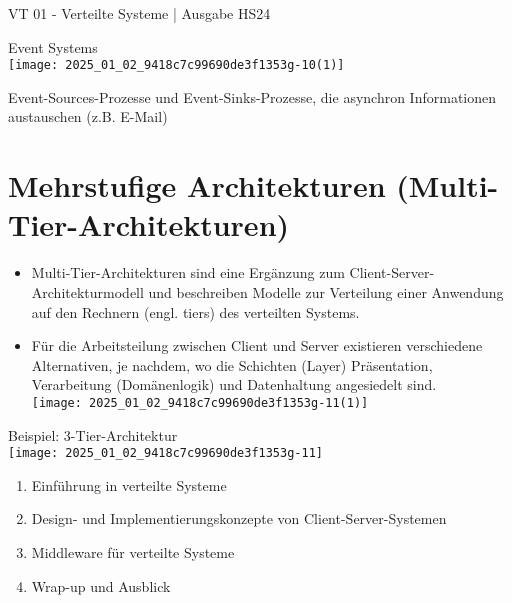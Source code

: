 \documentclass[10pt]{article}
\begin{document}
VT 01 - Verteilte Systeme | Ausgabe HS24

Event Systems\\
\texttt{[image: 2025\_01\_02\_9418c7c99690de3f1353g-10(1)]}

Event-Sources-Prozesse und Event-Sinks-Prozesse, die asynchron Informationen austauschen (z.B. E-Mail)

\section*{Mehrstufige Architekturen (Multi-Tier-Architekturen)}
\begin{itemize}
  \item Multi-Tier-Architekturen sind eine Ergänzung zum Client-Server-Architekturmodell und beschreiben Modelle zur Verteilung einer Anwendung auf den Rechnern (engl. tiers) des verteilten Systems.
  \item Für die Arbeitsteilung zwischen Client und Server existieren verschiedene Alternativen, je nachdem, wo die Schichten (Layer) Präsentation, Verarbeitung (Domänenlogik) und Datenhaltung angesiedelt sind.\\
\texttt{[image: 2025\_01\_02\_9418c7c99690de3f1353g-11(1)]}
\end{itemize}

Beispiel: 3-Tier-Architektur\\
\texttt{[image: 2025\_01\_02\_9418c7c99690de3f1353g-11]}

\begin{enumerate}
  \item Einführung in verteilte Systeme
  \item Design- und Implementierungskonzepte von Client-Server-Systemen
  \item Middleware für verteilte Systeme
  \item Wrap-up und Ausblick
\end{enumerate}
\end{document}
